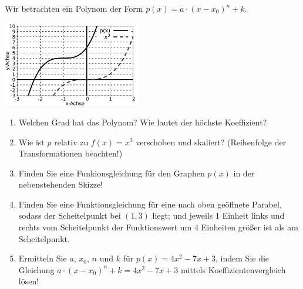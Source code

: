 \item Wir betrachten ein Polynom der Form $p(x) = a\cdot \left(x-x_0\right)^n+k$.

\begin{multicols}{2}
  \includegraphics[width=0.45\textwidth]{../pool/ex-fn-transform-2-a.png}

\begin{enumerate}
\item Welchen Grad hat das Polynom? Wie lautet der höchste Koeffizient?
\item Wie ist $p$ relativ zu $f(x)=x^3$ verschoben und skaliert? (Reihenfolge der Transformationen beachten!)
\item Finden Sie eine Funkionsgleichung für den Graphen $p(x)$ in der nebenstehenden Skizze! 
\item Finden Sie eine Funktionsgleichung für eine nach oben geöffnete Parabel, sodass der Scheitelpunkt bei $(1,3)$ liegt; und jeweils 1 Einheit links und rechts vom Scheitelpunkt der Funktionswert um 4 Einheiten größer ist als am Scheitelpunkt.
\item Ermitteln Sie $a$, $x_0$, $n$ und $k$ für $p(x)=4x^2-7x+3$, indem Sie die Gleichung $a\cdot \left(x-x_0\right)^n+k = 4x^2-7x+3$ mittels Koeffizientenvergleich lösen!
\end{enumerate}

\end{multicols}


